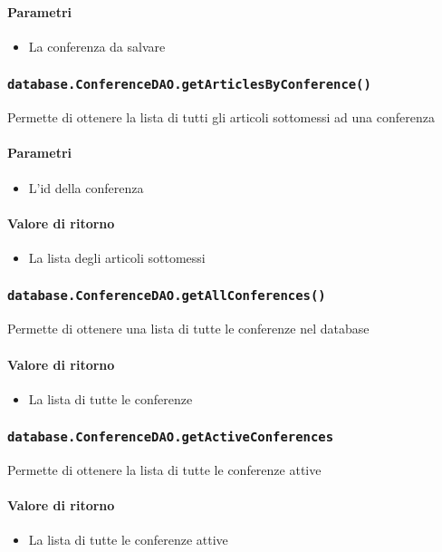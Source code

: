 \paragraph{Parametri}
\begin{itemize}
\item La conferenza da salvare
\end{itemize}

\subsubsection{\texttt{database.ConferenceDAO.getArticlesByConference()}}
Permette di ottenere la lista di tutti gli articoli sottomessi ad una conferenza
\paragraph{Parametri}
\begin{itemize}
\item L'id della conferenza
\end{itemize}
\paragraph{Valore di ritorno}
\begin{itemize}
\item La lista degli articoli sottomessi
\end{itemize}

\subsubsection{\texttt{database.ConferenceDAO.getAllConferences()}}
Permette di ottenere una lista di tutte le conferenze nel database
\paragraph{Valore di ritorno}
\begin{itemize}
\item La lista di tutte le conferenze
\end{itemize}

\subsubsection{\texttt{database.ConferenceDAO.getActiveConferences}}
Permette di ottenere la lista di tutte le conferenze attive
\paragraph{Valore di ritorno}
\begin{itemize}
\item La lista di tutte le conferenze attive
\end{itemize}


